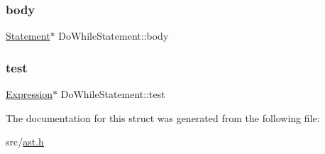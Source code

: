 \subsubsection{\texorpdfstring{body}{body}}
{\footnotesize\ttfamily \hyperlink{struct_statement}{Statement}$\ast$ Do\+While\+Statement\+::body}

\mbox{\label{struct_do_while_statement_acd80c72a8d08b897462572fcce19fa42}} 
\subsubsection{\texorpdfstring{test}{test}}
{\footnotesize\ttfamily \hyperlink{struct_expression}{Expression}$\ast$ Do\+While\+Statement\+::test}



The documentation for this struct was generated from the following file\+:\begin{DoxyCompactItemize}
\item 
src/\hyperlink{ast_8h}{ast.\+h}\end{DoxyCompactItemize}
